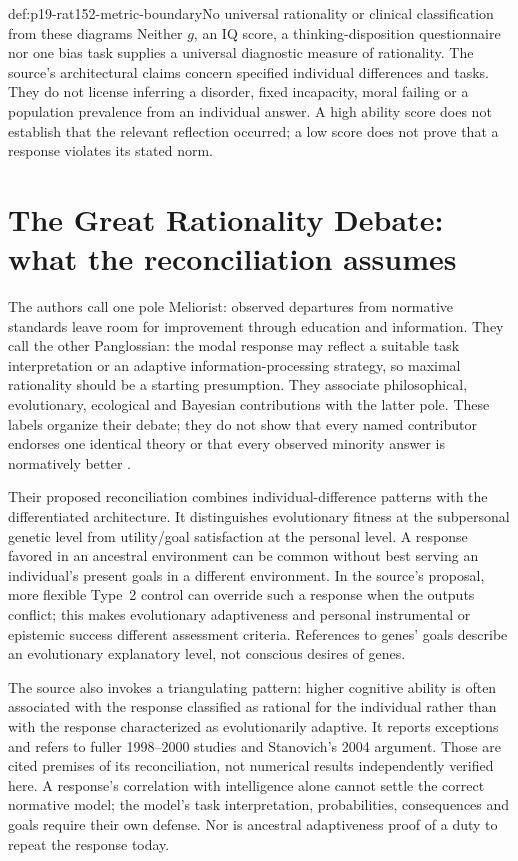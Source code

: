 \begin{hbwarning}{def:p19-rat152-metric-boundary}{No universal rationality or clinical classification from these diagrams}
Neither \(g\), an IQ score, a thinking-disposition questionnaire nor one
bias task supplies a universal diagnostic measure of rationality. The source's
architectural claims concern specified individual differences and tasks.
They do not license inferring a disorder, fixed incapacity, moral failing
or a population prevalence from an individual answer. A high ability score
does not establish that the relevant reflection occurred; a low score does
not prove that a response violates its stated norm.
\end{hbwarning}

\section{The Great Rationality Debate: what the reconciliation assumes}
\label{sec:p19-rat152-debate}

The authors call one pole Meliorist: observed departures from normative
standards leave room for improvement through education and information.
They call the other Panglossian: the modal response may reflect a suitable
task interpretation or an adaptive information-processing strategy, so
maximal rationality should be a starting presumption. They associate
philosophical, evolutionary, ecological and Bayesian contributions with
the latter pole. These labels organize their debate; they do not show
that every named contributor endorses one identical theory or that every
observed minority answer is normatively better
\cite[sec.~7, pp.~798--799]{StanovichToplakWest2021Intelligence}.

Their proposed reconciliation combines individual-difference patterns with
the differentiated architecture. It distinguishes evolutionary fitness
at the subpersonal genetic level from utility/goal satisfaction at the
personal level. A response favored in an ancestral environment can be
common without best serving an individual's present goals in a different
environment. In the source's proposal, more flexible Type~2 control can
override such a response when the outputs conflict; this makes evolutionary
adaptiveness and personal instrumental or epistemic success different
assessment criteria. References to genes' goals describe an evolutionary
explanatory level, not conscious desires of genes.

The source also invokes a triangulating pattern: higher cognitive ability
is often associated with the response classified as rational for the
individual rather than with the response characterized as evolutionarily
adaptive. It reports exceptions and refers to fuller 1998--2000 studies
and Stanovich's 2004 argument. Those are cited premises of its reconciliation,
not numerical results independently verified here. A response's correlation
with intelligence alone cannot settle the correct normative model; the
model's task interpretation, probabilities, consequences and goals require
their own defense. Nor is ancestral adaptiveness proof of a duty to repeat
the response today.

